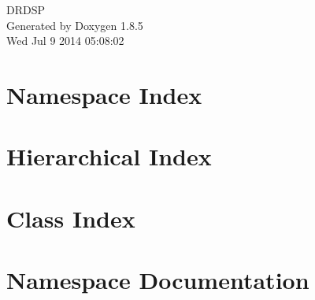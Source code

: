 \documentclass[twoside]{book}
\newcommand{\clearemptydoublepage}{%
  \newpage{\pagestyle{empty}\cleardoublepage}%
}
\begin{document}
\hypersetup{pageanchor=false}
\begin{titlepage}
\vspace*{7cm}
\begin{center}%
{\Large D\-R\-D\-S\-P }\\
\vspace*{1cm}
{\large Generated by Doxygen 1.8.5}\\
\vspace*{0.5cm}
{\small Wed Jul 9 2014 05:08:02}\\
\end{center}
\end{titlepage}
\clearemptydoublepage
\tableofcontents
\clearemptydoublepage
{}
\hypersetup{pageanchor=true}

\chapter{Namespace Index}

\chapter{Hierarchical Index}

\chapter{Class Index}

\chapter{Namespace Documentation}

\end{document}
